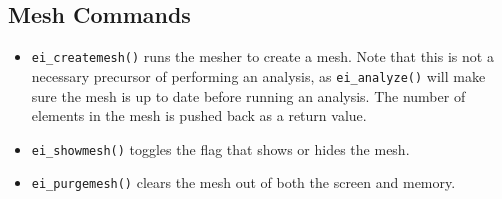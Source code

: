 \subsection{Mesh Commands}

\begin{itemize}
\item \texttt{ei\_createmesh()} runs the mesher to create a mesh. Note that this is not
a necessary precursor of performing an analysis, as
\texttt{ei\_analyze()} will make sure the mesh is up to date before
running an analysis. The number of elements in the mesh is pushed
back as a return value.

\item \texttt{ei\_showmesh()} toggles the flag that shows or hides the mesh.

\item \texttt{ei\_purgemesh()} clears the mesh out of both the screen and memory.
\end{itemize}

